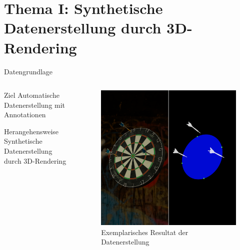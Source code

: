 
\section{Thema I: Synthetische Datenerstellung durch 3D-Rendering}

\begin{frame}{Datengrundlage}
    \begin{columns}
        \begin{column}{0.6\linewidth}

            \begin{block}{Ziel}
                Automatische Datenerstellung mit Annotationen
            \end{block}

            \begin{block}{Herangehensweise}
                Synthetische Datenerstellung durch 3D-Rendering
            \end{block}

        \end{column}
        \begin{column}{0.4\linewidth}

            \begin{figure}
                \centering
                \includegraphics[height=0.65\textheight]{imgs/datagen.png}
                \caption{Exemplarisches Resultat der Datenerstellung}
            \end{figure}

        \end{column}
    \end{columns}
\end{frame}


